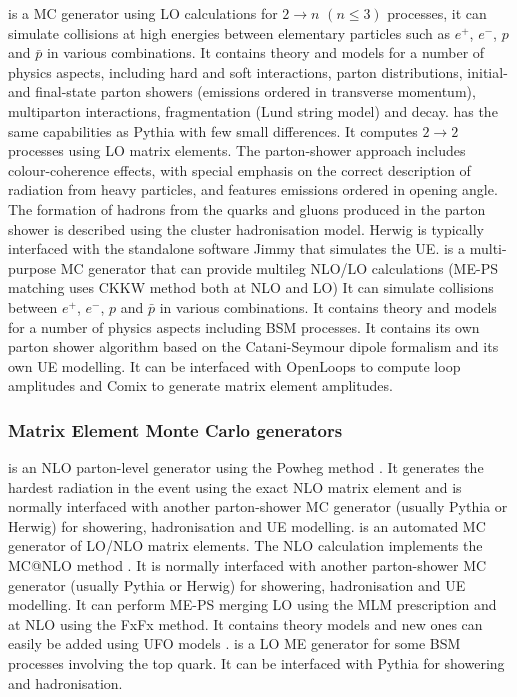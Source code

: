 \bi
{} \cite{Sjostrand:2006za,Pythia8} is a MC generator using LO calculations for $2\to n$ $(n\leq3)$ processes, it can simulate collisions at high energies between elementary particles such as $e^{+}$, $e^{-}$, $p$ and $\bar{p}$ in various combinations. It contains theory and models for a number of physics aspects, including hard and soft interactions, parton distributions, initial- and final-state parton showers (emissions ordered in transverse momentum), multiparton interactions, fragmentation (Lund string model) and decay.
 \cite{herwigpp} has the same capabilities as {\sc Pythia} with few small differences. It computes $2\to2$ processes using LO matrix elements. The parton-shower approach includes colour-coherence effects, with special emphasis on the correct description of radiation from heavy particles, and features emissions ordered in opening angle. The formation of hadrons from the quarks and gluons produced in the parton shower is described using the cluster hadronisation model. {\sc Herwig} is typically interfaced with the standalone software {\sc Jimmy} \cite{jimmy} that simulates the UE.
 \cite{Gleisberg:2008ta} is a multi-purpose MC generator that can provide multileg NLO/LO calculations (ME-PS matching uses CKKW method both at NLO and LO) It can simulate collisions between $e^{+}$, $e^{-}$, $p$ and $\bar{p}$ in various combinations. It contains theory and models for a number of physics aspects including BSM processes. It contains its own parton shower algorithm based on the Catani-Seymour dipole formalism \cite{Schumann:2007mg} and its own UE modelling. It can be interfaced with {\sc OpenLoops} \cite{Cascioli:2011va} to compute loop amplitudes and {\sc Comix} \cite{Gleisberg:2008fv} to generate matrix element amplitudes. 
\ei

\subsubsection{Matrix Element Monte Carlo generators}
\bi
{} \cite{powheg} is an NLO parton-level generator using the {\sc Powheg} method  \cite{powbox1}. It generates the hardest radiation in the event using the exact NLO matrix element and is normally interfaced with another parton-shower MC generator (usually {\sc Pythia} or {\sc Herwig}) for showering, hadronisation and UE modelling.
 \cite{Alwall:2014hca} is an automated MC generator of LO/NLO matrix elements. The NLO calculation implements the {\sc MC@NLO} method \cite{mcatnlo_1}. It is normally interfaced with another parton-shower MC generator (usually {\sc Pythia} or {\sc Herwig}) for showering, hadronisation and UE modelling. It can perform ME-PS merging LO using the MLM prescription and at NLO using the FxFx method. It contains theory models and new ones can easily be added using UFO models \cite{Degrande:2011ua}.  
 \cite{protos}  is a LO ME generator for some BSM processes involving the top quark.  It can be  interfaced with {\sc Pythia} for showering and hadronisation.
\ei

